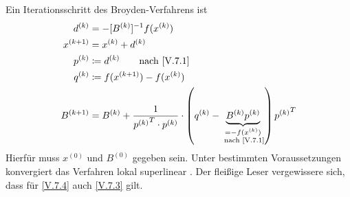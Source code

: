 Ein Iterationsschritt des Broyden-Verfahrens ist 
\begin{align}\nonumber
  d^{(k)} &= -[B^{(k)}]^{-1} f(x^{(k)}) \\\nonumber
  x^{(k+1)} &= x^{(k)} + d^{(k)} \\\nonumber
  p^{(k)} & \coloneqq d^{(k)} \qquad \text{nach
            \eqref{V.7.1}}\\\nonumber
  q^{(k)} & \coloneqq f(x^{(k+1)})-f(x^{(k)}) \\
  B^{(k+1)} & = B^{(k)} + \frac{1}{{p^{(k)}}^T\cdot p^{(k)}}
              \cdot \left(q^{(k)}-
              \underbrace{B^{(k)}p^{(k)}}_{\substack{=-f(x^{(k)})\\
  \text{ nach \eqref{V.7.1}}}}
  \right){p^{(k)}}^T
  \label{V.7.4}
\end{align}
Hierfür muss $x^{(0)} $ und $B^{(0)}$ gegeben sein.
Unter bestimmten Voraussetzungen konvergiert das Verfahren lokal
superlinear \cite[siehe][dortige Referenzen]{stoerbulirsch}.
Der fleißige Leser vergewissere sich, dass für
\eqref{V.7.4} auch \eqref{V.7.3} gilt.


